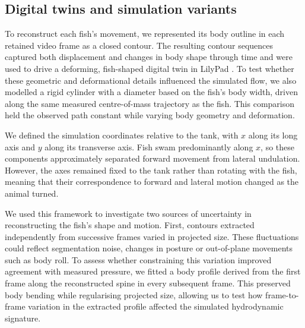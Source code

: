 \documentclass[openacc]{rsproca_new}
\begin{document}
\subsection{Digital twins and simulation variants}

To reconstruct each fish's movement, we represented its body outline in each retained video frame as a closed contour. The resulting contour sequences captured both displacement and changes in body shape through time and were used to drive a deforming, fish-shaped digital twin in LilyPad \cite{maertens2015}. To test whether these geometric and deformational details influenced the simulated flow, we also modelled a rigid cylinder with a diameter based on the fish's body width, driven along the same measured centre-of-mass trajectory as the fish. This comparison held the observed path constant while varying body geometry and deformation.

We defined the simulation coordinates relative to the tank, with $x$ along its long axis and $y$ along its transverse axis. Fish swam predominantly along $x$, so these components approximately separated forward movement from lateral undulation. However, the axes remained fixed to the tank rather than rotating with the fish, meaning that their correspondence to forward and lateral motion changed as the animal turned.

We used this framework to investigate two sources of uncertainty in reconstructing the fish's shape and motion. First, contours extracted independently from successive frames varied in projected size. These fluctuations could reflect segmentation noise, changes in posture or out-of-plane movements such as body roll. To assess whether constraining this variation improved agreement with measured pressure, we fitted a body profile derived from the first frame along the reconstructed spine in every subsequent frame. This preserved body bending while regularising projected size, allowing us to test how frame-to-frame variation in the extracted profile affected the simulated hydrodynamic signature.
\end{document}
